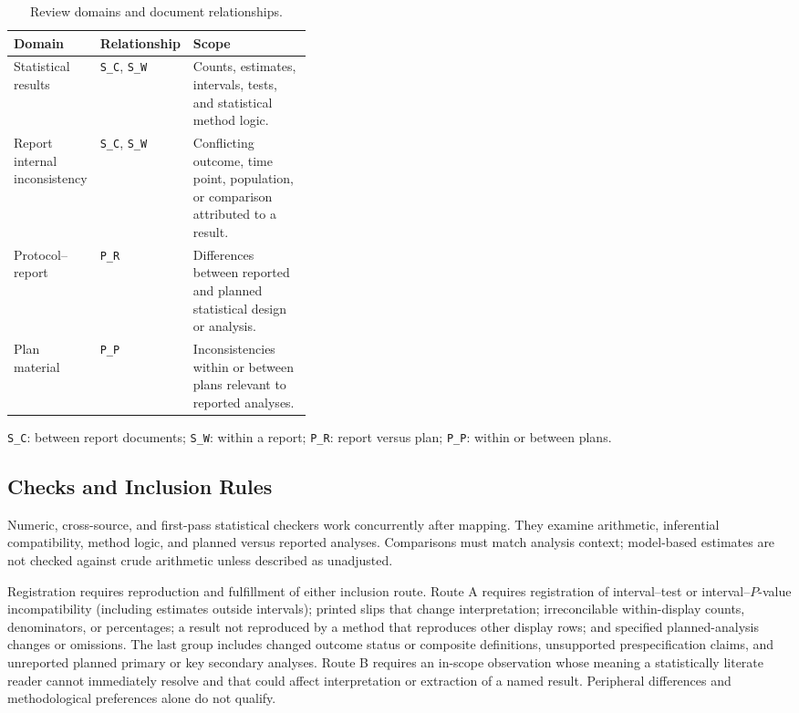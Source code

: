 \begin{table}[htbp]
\centering\small
\caption{Review domains and document relationships.}
\label{tab:review-domains}
\begin{tabularx}{\linewidth}{@{}p{0.24\linewidth}p{0.14\linewidth}X@{}}
\toprule
Domain & Relationship & Scope \\
\midrule
Statistical results & \texttt{S\_C}, \texttt{S\_W} & Counts, estimates, intervals, tests, and statistical method logic. \\
Report internal inconsistency & \texttt{S\_C}, \texttt{S\_W} & Conflicting outcome, time point, population, or comparison attributed to a result. \\
Protocol--report & \texttt{P\_R} & Differences between reported and planned statistical design or analysis. \\
Plan material & \texttt{P\_P} & Inconsistencies within or between plans relevant to reported analyses. \\
\bottomrule
\end{tabularx}
\par\smallskip\footnotesize
\texttt{S\_C}: between report documents; \texttt{S\_W}: within a report; \texttt{P\_R}: report versus plan; \texttt{P\_P}: within or between plans.
\end{table}

\subsection{Checks and Inclusion Rules}
\label{sec:framework-inclusion}

Numeric, cross-source, and first-pass statistical checkers work concurrently after mapping. They examine arithmetic, inferential compatibility, method logic, and planned versus reported analyses. Comparisons must match analysis context; model-based estimates are not checked against crude arithmetic unless described as unadjusted.

Registration requires reproduction and fulfillment of either inclusion route. Route A requires registration of interval--test or interval--\(P\)-value incompatibility (including estimates outside intervals); printed slips that change interpretation; irreconcilable within-display counts, denominators, or percentages; a result not reproduced by a method that reproduces other display rows; and specified planned-analysis changes or omissions. The last group includes changed outcome status or composite definitions, unsupported prespecification claims, and unreported planned primary or key secondary analyses. Route B requires an in-scope observation whose meaning a statistically literate reader cannot immediately resolve and that could affect interpretation or extraction of a named result. Peripheral differences and methodological preferences alone do not qualify.


